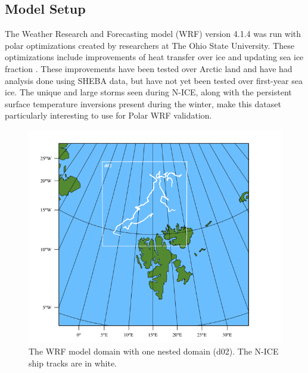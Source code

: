 \subsection{Model Setup}
The Weather Research and Forecasting model (WRF) version 4.1.4 was run with polar optimizations created by researchers at The Ohio State University. These optimizations include improvements of heat transfer over ice and updating sea ice fraction \citep{hines:2015}. These improvements have been tested over Arctic land and have had analysis done using SHEBA data, but have not yet been tested over first-year sea ice. The unique and large storms seen during N-ICE, along with the persistent surface temperature inversions present during the winter, make this dataset particularly interesting to use for Polar WRF validation.

\begin{figure}[H]
    \centering
    \includegraphics[width=1\linewidth]{figures/chapter3/wrf_domain.png}
    \caption[WRF Model Domain]{The WRF model domain with one nested domain (d02). The N-ICE ship tracks are in white.}
    \label{fig:wrf_domain}
\end{figure}

